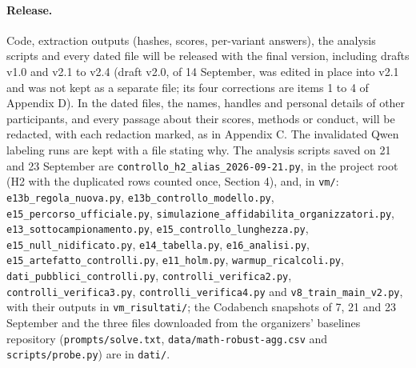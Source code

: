 \paragraph{Release.}
Code, extraction outputs (hashes, scores, per-variant answers), the analysis scripts and every dated file will be released with the final version, including drafts v1.0 and v2.1 to v2.4 (draft v2.0, of 14 September, was edited in place into v2.1 and was not kept as a separate file; its four corrections are items 1 to 4 of Appendix D). In the dated files, the names, handles and personal details of other participants, and every passage about their scores, methods or conduct, will be redacted, with each redaction marked, as in Appendix C. The invalidated Qwen labeling runs are kept with a file stating why. The analysis scripts saved on 21 and 23 September are \texttt{controllo\_h2\_alias\_2026-09-21.py}, in the project root (H2 with the duplicated rows counted once, Section 4), and, in \texttt{vm/}: \texttt{e13b\_regola\_nuova.py}, \texttt{e13b\_controllo\_modello.py}, \texttt{e15\_percorso\_ufficiale.py}, \texttt{simulazione\_affidabilita\_organizzatori.py}, \texttt{e13\_sottocampionamento.py}, \texttt{e15\_controllo\_lunghezza.py}, \texttt{e15\_null\_nidificato.py}, \texttt{e14\_tabella.py}, \texttt{e16\_analisi.py}, \texttt{e15\_artefatto\_controlli.py}, \texttt{e11\_holm.py}, \texttt{warmup\_ricalcoli.py}, \texttt{dati\_pubblici\_controlli.py}, \texttt{controlli\_verifica2.py}, \texttt{controlli\_verifica3.py}, \texttt{controlli\_verifica4.py} and \texttt{v8\_train\_main\_v2.py}, with their outputs in \texttt{vm\_risultati/}; the Codabench snapshots of 7, 21 and 23 September and the three files downloaded from the organizers' baselines repository (\texttt{prompts/solve.txt}, \texttt{data/math-robust-agg.csv} and \texttt{scripts/probe.py}) are in \texttt{dati/}.

